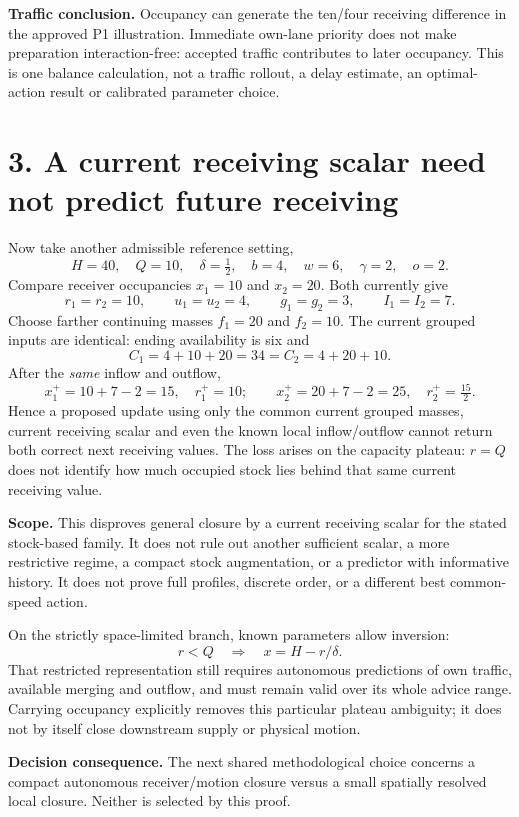 \documentclass[11pt,a4paper]{article}
\begin{document}
\textbf{Traffic conclusion.} Occupancy can generate the ten/four receiving
difference in the approved P1 illustration. Immediate own-lane priority does
not make preparation interaction-free: accepted traffic contributes to later
occupancy. This is one balance calculation, not a traffic rollout, a delay
estimate, an optimal-action result or calibrated parameter choice.

\newpage
\section*{3. A current receiving scalar need not predict future receiving}
Now take another admissible reference setting,
\[
 H=40,\quad Q=10,\quad\delta=\tfrac12,
 \quad b=4,\quad w=6,\quad\gamma=2,\quad o=2.
\]
Compare receiver occupancies $x_1=10$ and $x_2=20$. Both currently give
\[
 r_1=r_2=10,\qquad u_1=u_2=4,\qquad g_1=g_2=3,
 \qquad I_1=I_2=7.
\]
Choose farther continuing masses $f_1=20$ and $f_2=10$. The current grouped
inputs are identical: ending availability is six and
\[
 C_1=4+10+20=34=C_2=4+20+10.
\]
After the \emph{same} inflow and outflow,
\[
 x_1^+=10+7-2=15,\quad r_1^+=10;\qquad
 x_2^+=20+7-2=25,\quad r_2^+=\tfrac{15}{2}.
\]
Hence a proposed update using only the common current grouped masses,
current receiving scalar and even the known local inflow/outflow cannot
return both correct next receiving values. The loss arises on the capacity
plateau: $r=Q$ does not identify how much occupied stock lies behind that
same current receiving value.

\textbf{Scope.} This disproves general closure by a current receiving scalar
for the stated stock-based family. It does not rule out another sufficient
scalar, a more restrictive regime, a compact stock augmentation, or a predictor
with informative history. It does not prove full profiles, discrete order,
or a different best common-speed action.

On the strictly space-limited branch, known parameters allow inversion:
\[
 r<Q\quad\Longrightarrow\quad x=H-r/\delta.
\]
That restricted representation still requires autonomous predictions of own
traffic, available merging and outflow, and must remain valid over its whole
advice range. Carrying occupancy explicitly removes this particular plateau
ambiguity; it does not by itself close downstream supply or physical motion.

\textbf{Decision consequence.} The next shared methodological choice concerns
a compact autonomous receiver/motion closure versus a small spatially resolved
local closure. Neither is selected by this proof.
\end{document}
